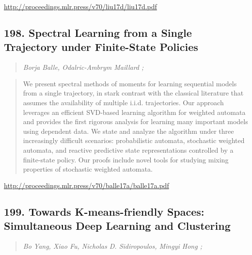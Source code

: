 \documentclass{article}
\begin{document}
\href{http://proceedings.mlr.press/v70/liu17d/liu17d.pdf}{http://proceedings.mlr.press/v70/liu17d/liu17d.pdf}

\subsection{198. Spectral Learning from a Single Trajectory under Finite-State Policies}

\begin{quote}
\footnotesize{\textit{Borja Balle, Odalric-Ambrym Maillard ;}}
\end{quote}

\begin{quote}
    We present spectral methods of moments for learning sequential models from a single trajectory, in stark contrast with the classical literature that assumes the availability of multiple i.i.d. trajectories. Our approach leverages an efficient SVD-based learning algorithm for weighted automata and provides the first rigorous analysis for learning many important models using dependent data. We state and analyze the algorithm under three increasingly difficult scenarios: probabilistic automata, stochastic weighted automata, and reactive predictive state representations controlled by a finite-state policy. Our proofs include novel tools for studying mixing properties of stochastic weighted automata.  \end{quote}

\href{http://proceedings.mlr.press/v70/balle17a/balle17a.pdf}{http://proceedings.mlr.press/v70/balle17a/balle17a.pdf}

\subsection{199. Towards K-means-friendly Spaces: Simultaneous Deep Learning and Clustering}

\begin{quote}
\footnotesize{\textit{Bo Yang, Xiao Fu, Nicholas D. Sidiropoulos, Mingyi Hong ;}}
\end{quote}
\end{document}
